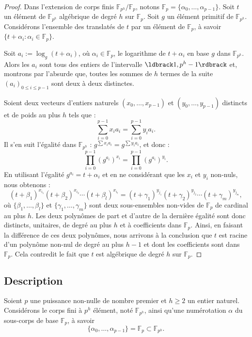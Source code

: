 \documentclass[a4paper, titlepage, 11pt]{article}
\theoremstyle{definition}
\theoremstyle{remark}
\def\gf #1{\mathbb{F}_{#1}}
\newcommand{\extension}[2]{{#1} / {#2}} %
\begin{document}
\begin{proof}
Dans l'extension de corps finis $\extension{\gf{p^h}}{\gf{p}}$, notons $\gf{p} = \{\alpha_0, \dots, \alpha_{p-1} \}$. Soit $t$ un élément de $\gf{p^h}$ algébrique de degré $h$ sur $\gf{p}$. Soit $g$ un élément primitif de $\gf{p^h}$. Considérons l'ensemble des translatés de $t$ par un élément de $\gf{p}$, à savoir $\{ t + \alpha_i : \alpha_i \in \gf{p} \}$.

Soit $a_i := \log_g(t + \alpha_i)$, où $\alpha_i \in \gf{p}$, le logarithme de $t+\alpha_i$ en base $g$ dans $\gf{p^h}$. Alors les $a_i$ sont tous des entiers de l'intervalle $\ldbrack1, p^h -1\rdbrack$ et, montrons par l'absurde que, toutes les sommes de $h$ termes de la suite ${(a_i)}_{0\leqslant i \leqslant p-1}$ sont deux à deux distinctes. 

Soient deux vecteurs d'entiers naturels $(x_0, \dots, x_{p-1})$ et $(y_0, \dots, y_{p-1})$ distincts et de poids au plus $h$ tels que :
$$\sum_{i=0}^{p-1}x_ia_i = \sum_{i=0}^{p-1}y_ia_i.$$
Il s'en suit l'égalité dans $\gf{p^h}$ : $g^{\sum x_ia_i} = g^{\sum y_ia_i}$, et donc :
$$\prod_{i=0}^{p-1} {\left({g^{a_i}}\right)}^{x_i} = \prod_{i=0}^{p-1} {\left({g^{a_i}}\right)}^{y_i}.$$
En utilisant l'égalité $g^{a_i} = t + \alpha_i$ et en ne considérant que les $x_i$ et $y_i$ non-nuls, nous obtenons :
$$(t+\beta_1)^{x_{i_1}}(t+\beta_2)^{x_{i_2}} \cdots (t+\beta_l)^{x_{i_l}} = (t+\gamma_1)^{y_{j_1}}(t+\gamma_2)^{y_{j_2}} \cdots (t+\gamma_m)^{y_{j_m}},$$
où $\{\beta_1, \dots, \beta_l \}$ et $\{ \gamma_1, \dots, \gamma_m\}$ sont deux sous-ensembles non-vides de $\gf{p}$ de cardinal au plus $h$. Les deux polynômes de part et d'autre de la dernière égalité sont donc distincts, unitaires, de degré au plus $h$ et à coefficients dans $\gf{p}$. Ainsi, en faisant la différence de ces deux polynômes, nous arrivons à la conclusion que $t$ est racine d'un polynôme non-nul de degré au plus $h-1$ et dont les coefficients sont dans $\gf{p}$. Cela contredit le fait que $t$ est algébrique de degré $h$ sur $\gf{p}$.
\end{proof}

\subsection{Description}

Soient $p$ une puissance non-nulle de nombre premier et $h \geqslant 2$ un entier naturel. Considérons le corps fini à $p^h$ élément, noté $\gf{p^h}$, ainsi qu'une numérotation $\alpha$ du sous-corps de base $\gf{p}$, à savoir $$\{\alpha_0,\dots, \alpha_{p-1}\} = \gf{p} \subset \gf{p^h}.$$
\end{document}
